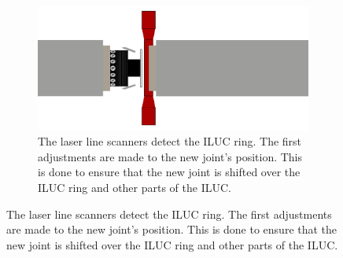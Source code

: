 \begin{figure}[H]
\begin{subfigure}{0.7\textwidth}
        \label{fig:oop_track}
    \end{subfigure}
    \begin{subfigure}{0.7\textwidth}
        \includegraphics[width=\textwidth ]{images/lua_oop_ILUC_ring.png}
        \caption{The laser line scanners detect the ILUC ring. The first adjustments are made to the new joint's position.
            This is done to ensure that the new joint is shifted over the ILUC ring and other parts of the ILUC.}
        \label{fig:oop_ILUC_ring}
    \end{subfigure}
\end{figure}
